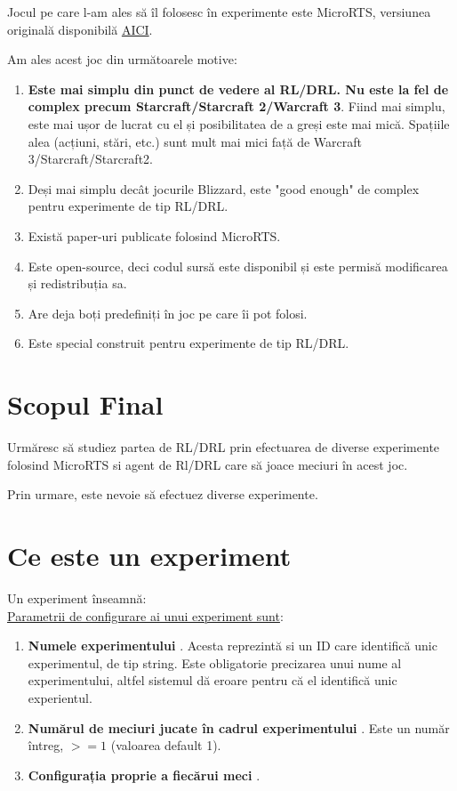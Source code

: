 \documentclass{article}
\begin{document}
Jocul pe care l-am ales să îl folosesc în experimente este MicroRTS, versiunea originală disponibilă \href{https://github.com/Farama-Foundation/MicroRTS}{AICI}.

Am ales acest joc din următoarele motive:
\begin{enumerate}
    \item \textbf{Este mai simplu din punct de vedere al RL/DRL. Nu este la fel de complex precum Starcraft/Starcraft 2/Warcraft 3}. Fiind mai simplu, este mai ușor de lucrat cu el și posibilitatea de a greși este mai mică. Spațiile alea (acțiuni, stări, etc.) sunt mult mai mici față de Warcraft 3/Starcraft/Starcraft2.

    \item Deși mai simplu decât jocurile Blizzard, este "good enough" de complex pentru experimente de tip RL/DRL.

    \item Există paper-uri publicate folosind MicroRTS.

    \item Este open-source, deci codul sursă este disponibil și este permisă modificarea și redistribuția sa.

    \item Are deja boți predefiniți în joc pe care îi pot folosi.

    \item Este special construit pentru experimente de tip RL/DRL.
\end{enumerate}

\section{Scopul Final}
Urmăresc să studiez partea de RL/DRL prin efectuarea de diverse experimente folosind MicroRTS si agent de Rl/DRL care să joace meciuri în acest joc.

Prin urmare, este nevoie să efectuez diverse experimente.

\section{Ce este un experiment}

Un experiment înseamnă: \textbf{\color{red}{Unul sau mai multe meciuri de MicroRTS, jucate fie Agenți-Agenți, fie Agenți-AI default din joc, în diverse configurații.} }\\

\underline{Parametrii de configurare ai unui experiment sunt}:
\begin{enumerate}
    \item \textbf{ Numele experimentului }. Acesta reprezintă si un ID care identifică unic experimentul, de tip string. Este obligatorie precizarea unui nume al experimentului, altfel sistemul dă eroare pentru că el identifică unic experientul.

    \item \textbf{ Numărul de meciuri jucate în cadrul experimentului }. Este un număr întreg, $>=1$ (valoarea default 1).

    \item \textbf{ Configurația proprie a fiecărui meci }.
\end{enumerate}
\end{document}
